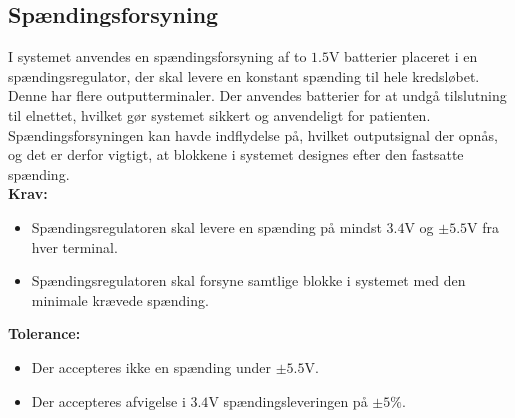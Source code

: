 \subsection{Spændingsforsyning}\label{Krav_spaending_spicifikt}
I systemet anvendes en spændingsforsyning af to $1.5$V batterier placeret i en spændingsregulator, der skal levere en konstant spænding til hele kredsløbet. Denne har flere outputterminaler. Der anvendes batterier for at undgå tilslutning til elnettet, hvilket gør systemet sikkert og anvendeligt for patienten. Spændingsforsyningen kan havde indflydelse på, hvilket outputsignal der opnås, og det er derfor vigtigt, at blokkene i systemet designes efter den fastsatte spænding. \\
\noindent\textbf{Krav:}
\begin{itemize}
	\item Spændingsregulatoren skal levere en spænding på mindst $3.4$V og $\pm5.5$V fra hver terminal.
	\item Spændingsregulatoren skal forsyne samtlige blokke i systemet med den minimale krævede spænding.
\end{itemize}
\noindent\textbf{Tolerance:}
\begin{itemize}
	\item Der accepteres ikke en spænding under $\pm5.5$V.
	\item Der accepteres afvigelse i $3.4$V spændingsleveringen på $\pm5\%$.
\end{itemize}

